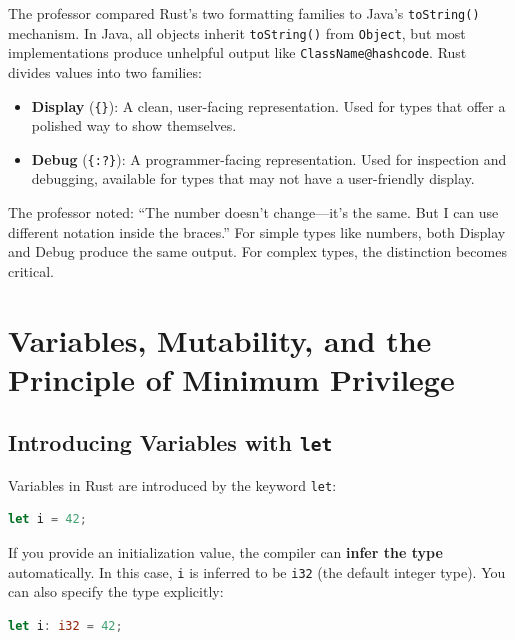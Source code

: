 \begin{insightbox}
The professor compared Rust's two formatting families to Java's \texttt{toString()} mechanism. In Java, all objects inherit \texttt{toString()} from \texttt{Object}, but most implementations produce unhelpful output like \texttt{ClassName@hashcode}. Rust divides values into two families:
\begin{itemize}
    \item \textbf{Display} (\texttt{\{\}}): A clean, user-facing representation. Used for types that offer a polished way to show themselves.
    \item \textbf{Debug} (\texttt{\{:?\}}): A programmer-facing representation. Used for inspection and debugging, available for types that may not have a user-friendly display.
\end{itemize}
The professor noted: ``The number doesn't change---it's the same. But I can use different notation inside the braces.'' For simple types like numbers, both Display and Debug produce the same output. For complex types, the distinction becomes critical.
\end{insightbox}

\section{Variables, Mutability, and the Principle of Minimum Privilege}

\subsection{Introducing Variables with \texttt{let}}

Variables in Rust are introduced by the keyword \texttt{let}:

\begin{lstlisting}[language=Rust]
let i = 42;
\end{lstlisting}

If you provide an initialization value, the compiler can \textbf{infer the type} automatically. In this case, \texttt{i} is inferred to be \texttt{i32} (the default integer type). You can also specify the type explicitly:

\begin{lstlisting}[language=Rust]
let i: i32 = 42;
\end{lstlisting}


